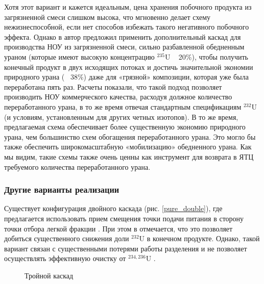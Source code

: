 Хотя этот вариант и кажется идеальным, цена хранения побочного продукта из загрязненной смеси слишком высока, что мгновенно делает схему нежизнеспособной, если нет способов избежать такого негативного побочного эффекта.
Однако в \cite{smirnovMethodEnrichReprocessed2019} автор предложил применить дополнительный каскад для производства НОУ из загрязненной смеси, сильно разбавленной обедненным ураном (которые имеют высокую концентрацию $^{235}$U ~ 20\%), чтобы получить конечный продукт в двух исходящих потоках и достичь значительной экономии природного урана (~ 38\%) даже для «грязной» композиции, которая уже была переработана пять раз. Расчеты показали, что такой подход позволяет производить НОУ коммерческого качества, расходуя должное количество переработанного урана, в то же время отвечая стандартным спецификациям $^{232}$U (и условиям, установленным для других четных изотопов). В то же время, предлагаемая схема обеспечивает более существенную экономию природного урана, чем большинство схем обогащения переработанного урана. Это могло бы также обеспечить широкомасштабную «мобилизацию» обедненного урана.
Как мы видим, такие схемы также очень ценны как инструмент для возврата в ЯТЦ требуемого количества переработанного урана.

\subsubsection{Другие варианты реализации}

Существует конфигурация двойного каскада (рис. \ref{pure_double}), где предлагается использовать прием смещения точки подачи питания в сторону точки отбора легкой фракции \cite{sulaberidzeProblemsRefinementRecycled4}. При этом в \cite{palkinReprocessedUraniumPurification2013} отмечается, что это позволяет добиться существенного снижения доли $^{232}$U в конечном продукте. Однако, такой вариант связан с существенными потерями работы разделения и не позволяет осуществлять эффективную очистку от $^{234,236}$U \cite{palkinPurificationReprocessedUranium2016}.
\begin{figure}[ht]
  \caption{Тройной каскад}\label{fig:pure_double}
\end{figure}

